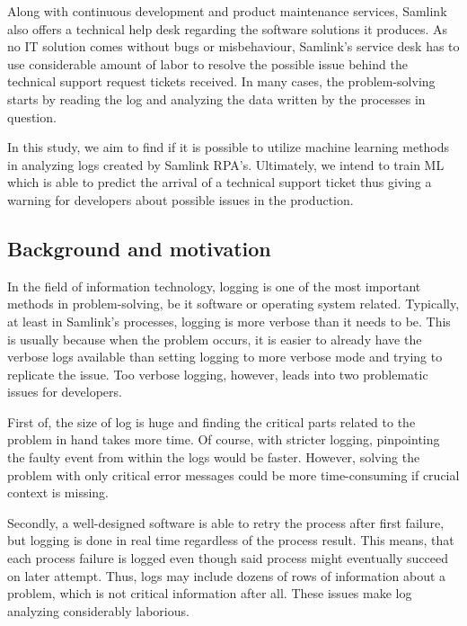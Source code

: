 Along with continuous development
and product maintenance services,
Samlink also offers a technical help desk
regarding the software solutions it produces.
As no IT solution comes without bugs or misbehaviour,
Samlink's service desk has to use considerable amount of labor
to resolve the possible issue
behind the technical support request tickets received.
In many cases,
the problem-solving starts by reading the log
and analyzing the data written by the processes in question.

In this study,
we aim to find if it is possible to utilize
machine learning methods in analyzing logs
created by Samlink RPA's.
Ultimately,
we intend to train ML
which is able to predict the arrival of a technical support ticket
thus giving a warning for developers about possible issues
in the production.



\subsection{Background and motivation}\label{subsec:intro-background-and-motivation}
In the field of information technology,
logging is one of the most important methods
in problem-solving,
be it software or operating system related.\cite{delarosa2018log}
Typically,
at least in Samlink's processes,
logging is more verbose
than it needs to be.
This is usually because when the problem occurs,
it is easier to already have the verbose logs available
than setting logging to more verbose mode and trying to replicate the issue.
Too verbose logging, however,
leads into two problematic issues for developers.

First of, the size of log is huge
and finding the critical parts
related to the problem in hand
takes more time.
Of course,
with stricter logging,
pinpointing the faulty event from within the logs
would be faster.
However,
solving the problem with only critical error messages
could be more time-consuming
if crucial context is missing.

Secondly,
a well-designed software
is able to retry the process after first failure,
but logging is done in real time regardless of the process result.
This means,
that each process failure is logged
even though said process might eventually succeed on later attempt.
Thus,
logs may include dozens of rows of information about a problem,
which is not critical information after all.
These issues make log analyzing considerably laborious.

